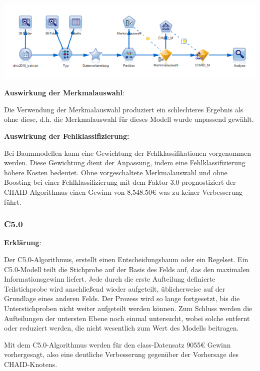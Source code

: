 \documentclass[a4paper,12pt]{article}
\newcounter{Algorithmus}
\begin{document}
\begin{center}
\includegraphics[width=\textwidth]{Screens/chaid_m}
\end{center}

{\bf Auswirkung der Merkmalauswahl}:
\par
\vspace{0.2cm}
Die Verwendung der Merkmalauswahl produziert ein schlechteres Ergebnis als ohne diese, d.h. die Merkmalauswahl für dieses Modell wurde unpassend gewählt.
\par
\vspace{0.2cm}

{\bf Auswirkung der Fehlklassifizierung:}
\par
\vspace{0.2cm}
Bei Baummodellen kann eine Gewichtung der Fehlklassifikationen vorgenommen werden. Diese
Gewichtung dient der Anpassung, indem eine Fehlklassifizierung höhere
Kosten bedeutet. Ohne vorgeschaltete Merkmalauswahl und ohne Boosting bei einer Fehlklassifizierung mit dem Faktor 3.0 prognostiziert der CHAID-Algorithmus einen Gewinn von 8,548.50\;\euro\;
was zu keiner Verbesserung führt.

\subsubsection{C5.0}
{\bf Erklärung}:
\par
\vspace{0.2cm}
Der C5.0-Algorithmus, erstellt einen Entscheidungsbaum oder ein Regelset.
 Ein C5.0-Modell teilt die Stichprobe auf der Basis des Felds auf, das den maximalen
Informationsgewinn liefert. Jede durch die erste Aufteilung definierte Teilstichprobe wird anschließend
wieder aufgeteilt, üblicherweise auf der Grundlage eines anderen Felds. Der Prozess wird so lange fortgesetzt,
bis die Unterstichproben nicht weiter aufgeteilt werden können. Zum Schluss werden die Aufteilungen
der untersten Ebene noch einmal untersucht, wobei solche entfernt oder reduziert werden, die nicht
wesentlich zum Wert des Modells beitragen.
\par
\vspace{0.2cm}
Mit dem C5.0-Algorithmus werden für den class-Datensatz 9055\;\euro\; Gewinn vorhergesagt, also eine deutliche Verbesserung gegenüber der Vorhersage des CHAID-Knotens.
\end{document}
